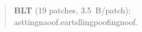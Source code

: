 \begin{quote}
\textbf{BLT} (19 patches, 3.5~B/patch):\\[1pt]
\allowbreak{}\bb{\textvisiblespace{}}\allowbreak{}\allowbreak{}a\allowbreak{}\allowbreak{}\textvisiblespace{}\allowbreak{}\allowbreak{}s\allowbreak{}\textvisiblespace{}\allowbreak{}\allowbreak{}\allowbreak{}t\allowbreak{}t\allowbreak{}i\allowbreak{}n\allowbreak{}g\allowbreak{}\textvisiblespace{}\allowbreak{}\allowbreak{}n\allowbreak{}\textvisiblespace{}\allowbreak{}a\allowbreak{}\textvisiblespace{}\allowbreak{}\allowbreak{}o\allowbreak{}o\allowbreak{}f\allowbreak{}.\allowbreak{}\textvisiblespace{}\allowbreak{}\allowbreak{}e\allowbreak{}\textvisiblespace{}\allowbreak{}\allowbreak{}\allowbreak{}a\allowbreak{}r\allowbreak{}t\allowbreak{}s\allowbreak{}\textvisiblespace{}\allowbreak{}\allowbreak{}\allowbreak{}l\allowbreak{}l\allowbreak{}i\allowbreak{}n\allowbreak{}g\allowbreak{}\textvisiblespace{}\allowbreak{}\allowbreak{}p\allowbreak{}\textvisiblespace{}\allowbreak{}\allowbreak{}o\allowbreak{}o\allowbreak{}f\allowbreak{}i\allowbreak{}n\allowbreak{}g\allowbreak{}\textvisiblespace{}\allowbreak{}\allowbreak{}n\allowbreak{}\textvisiblespace{}\allowbreak{}\allowbreak{}\textvisiblespace{}\allowbreak{}\allowbreak{}o\allowbreak{}o\allowbreak{}f\allowbreak{}.\allowbreak{}\\[6pt]
\end{quote}

